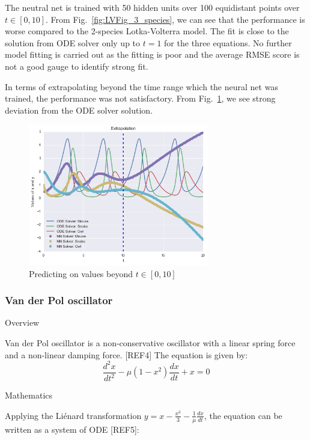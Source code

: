 \documentclass[11pt]{article}
\begin{document}
The neutral net is trained with 50 hidden units over 100 equidistant points over $t \in [0, 10]$. From Fig.~\ref{fig:LVFig_3_species}, we can see that the performance is worse compared to the 2-species Lotka-Volterra model. The fit is close to the solution from ODE solver only up to $t = 1$ for the three equations. No further model fitting is carried out as the fitting is poor and the average RMSE score is not a good gauge to identify strong fit. 

In terms of extrapolating beyond the time range which the neural net was trained, the performance was not satisfactory. From Fig.~\ref{fig:LV3Extrap}, we see strong deviation from the ODE solver solution.


\begin{figure}
\centering
\includegraphics[width=0.7\textwidth]{extrapo_LV3.png}
      \caption{Predicting on values beyond $t\in [0, 10]$ \label{fig:LV3Extrap}}
\end{figure}


\subsubsection{Van der Pol oscillator}
Overview

Van der Pol oscillator is a non-conservative oscillator with a linear spring force and a non-linear damping force.  [REF4] The equation is given by:
     \begin{equation}
      \frac{d^2x}{dt^2} - \mu(1-x^2)\frac{dx}{dt} + x = 0
      \label{eq:VDP}
    \end{equation}
    
Mathematics

Applying the Li\'enard transformation $y = x - \frac{x^3}{3} - \frac{1}{\mu}\frac{dx}{dt}$, the equation can be written as a system of ODE [REF5]:
\end{document}
